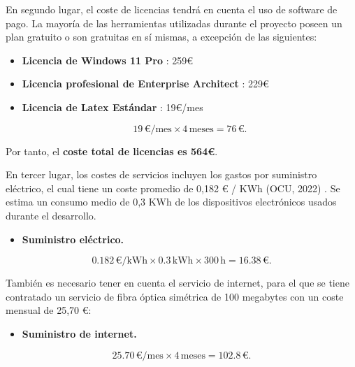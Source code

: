 En segundo lugar, el coste de licencias tendrá en cuenta el uso de software de pago. La mayoría de las herramientas utilizadas durante el proyecto poseen un plan gratuito o son gratuitas en sí mismas, a excepción de las siguientes:

\begin{itemize}
    \item \textbf{Licencia de Windows 11 Pro} : 259€
    \item \textbf{Licencia profesional de Enterprise Architect} : 229€
    \item \textbf{Licencia de Latex Estándar} : 19€/mes

\begin{equation}
    19 \, \text{€/mes} \times 4 \, \text{meses} = 76 \, \text{€}.
\end{equation}
    
\end{itemize}

Por tanto, el \textbf{coste total de licencias es 564€}.

En tercer lugar, los costes de servicios incluyen los gastos por suministro eléctrico, el cual tiene un coste promedio de 0,182 € / KWh (OCU, 2022) . Se estima un consumo medio de 0,3 KWh de los dispositivos electrónicos usados durante el desarrollo.

\begin{itemize}
    \item \textbf{Suministro eléctrico.}
\end{itemize}

\begin{equation}
0.182 \, \text{€/kWh} \times 0.3 \, \text{kWh} \times 300 \, \text{h} = 16.38 \, \text{€}.
\end{equation}

También es necesario tener en cuenta el servicio de internet, para el que se tiene contratado un servicio de fibra óptica simétrica de 100 megabytes con un coste mensual de 25,70 €:

\begin{itemize}
    \item \textbf{Suministro de internet.}
\end{itemize}

\begin{equation}
25.70 \, \text{€/mes} \times 4 \, \text{meses} = 102.8 \, \text{€}.
\end{equation}

